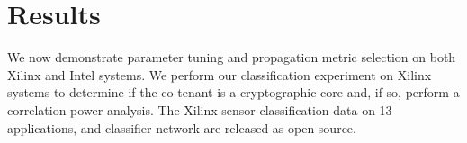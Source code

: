 
\section{Results}
\label{results}
We now demonstrate parameter tuning and propagation metric selection on both Xilinx and Intel systems. We perform our classification experiment on Xilinx systems to determine if the co-tenant is a cryptographic core and, if so, perform a correlation power analysis. The Xilinx sensor classification data on 13 applications, and classifier network are released as open source.

